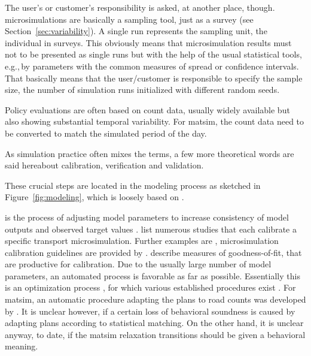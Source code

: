 The user's or customer's responsibility is asked, at another place, though. \Glspl{microsimulation} are basically a sampling tool, just as a survey (see Section~\ref{sec:variability}). A single run represents the sampling unit, the individual in surveys. This obviously means that \gls{microsimulation} results must not to be presented as single runs but with the help of the usual statistical tools, e.g.,\,by parameters with the common measures of spread or confidence intervals. That basically means that the user/customer is responsible to specify the sample size, the number of simulation runs initialized with different random seeds. 

Policy evaluations are often based on count data, usually widely available but also showing substantial temporal variability. For \gls{matsim}, the count data need to be converted to match the simulated period of the day.

As simulation practice often mixes the terms, a few more theoretical words are said hereabout calibration, verification and validation. 

These crucial steps are located in the modeling process as sketched in Figure~\ref{fig:modeling}, which is loosely based on \citet[][Figure 10.2]{Petty_SokolowskiBanks_2010}. 

 is the process of adjusting model parameters to increase consistency of model outputs and observed target values \citep[][p.348]{HollanderLiu_Transportation_2007} \citep[see also][]{TrucanoEtAl_RESS_2006}. \citet[][Table 1]{HollanderLiu_Transportation_2007} list numerous studies that each calibrate a specific transport microsimulation. Further examples are \citet[][]{SmithEtAl_JTE_2008, KimEtAl_TRR_2005, RutterEtAl_JASA_2009}, microsimulation calibration guidelines are provided by \citet[][]{MilamChao_TRBATPM_2001, WegmannEverett_TechRep_CTRUT_2008, DowlingEtAl_manual_2002}. \citet[][Table 2]{HollanderLiu_Transportation_2007} describe measures of goodness-of-fit, that are productive for calibration. Due to the usually large number of model parameters, an automated process is favorable as far as possible. Essentially this is an optimization process \citep[][p.353]{HollanderLiu_Transportation_2007}, for which various established procedures exist \citep[e.g.,][p.41ff]{ZhangMa_ResRep_PATH_2008}. For \gls{matsim}, an automatic procedure adapting the plans to road counts was developed by \citet[][]{floetteroed-2010e}. It is unclear however, if a certain loss of behavioral soundness is caused by adapting plans according to statistical matching. On the other hand, it is unclear anyway, to date, if the \gls{matsim} relaxation transitions should be given a behavioral meaning.

